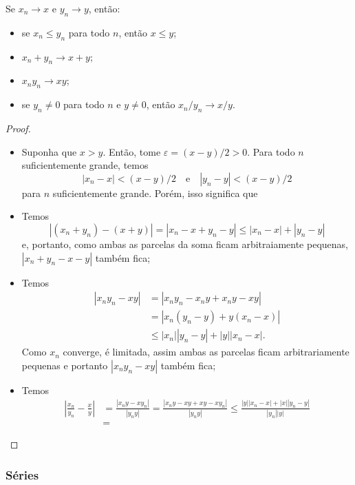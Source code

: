 \begin{proposition}
    Se $x_n \to x$ e $y_n \to y$, então: \begin{itemize}
        \item se $x_n \leq y_n$ para todo $n$, então $x \leq y$;
        \item $x_n + y_n \to x + y$;
        \item $x_ny_n \to xy$;
        \item se $y_n \neq 0$ para todo $n$ e $y \neq 0$, então $x_n/y_n \to x/y$.
    \end{itemize}
\end{proposition}
\begin{proof}
    \begin{itemize}
        \item Suponha que $x > y$. Então, tome $\varepsilon = (x-y)/2 > 0$. Para todo $n$ suficientemente grande, temos \begin{equation}
            |x_n - x| < (x-y)/2 \quad \text{e} \quad |y_n - y| < (x-y)/2
        \end{equation} para $n$ suficientemente grande. Porém, isso significa que 
        \item Temos \begin{equation}
            |(x_n + y_n) - (x + y)| = |x_n - x + y_n - y| \leq |x_n - x| + |y_n - y|
        \end{equation} e, portanto, como ambas as parcelas da soma ficam arbitraiamente pequenas, $|x_n + y_n - x - y|$ também fica;
        \item Temos \begin{align}
            |x_ny_n - xy| &= |x_ny_n - x_ny + x_ny - xy| \\ &= |x_n(y_n - y) + y(x_n - x)| \\ &\leq |x_n||y_n - y| + |y||x_n - x|.
        \end{align} Como $x_n$ converge, é limitada, assim ambas as parcelas ficam arbitrariamente pequenas e portanto $|x_ny_n - xy|$ também fica;
        \item Temos \begin{align}
            \left|\frac{x_n}{y_n} - \frac{x}{y}\right| &= \frac{|x_ny - xy_n|}{|y_n y|} = \frac{|x_ny - xy + xy - xy_n|}{|y_ny|} \leq \frac{|y||x_n - x| + |x||y_n - y|}{|y_n||y|} \\ &= 
        \end{align}
    \end{itemize}
\end{proof}

\subsubsection*{Séries}